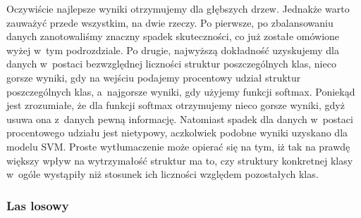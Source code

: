 Oczywiście najlepsze wyniki otrzymujemy dla głębszych drzew. Jednakże warto zauważyć przede wszystkim, na dwie rzeczy. Po pierwsze, po zbalansowaniu danych zanotowaliśmy znaczny spadek skuteczności, co już zostałe omówione wyżej w~tym podrozdziale. Po drugie, najwyższą dokładność uzyskujemy dla danych w~postaci bezwzględnej liczności struktur poszczególnych klas, nieco gorsze wyniki, gdy na wejściu podajemy procentowy udział struktur poszczególnych klas, a~najgorsze wyniki, gdy użyjemy funkcji softmax. Poniekąd jest zrozumiałe, że dla funkcji softmax otrzymujemy nieco gorsze wyniki, gdyż usuwa ona z~danych pewną informację. Natomiast spadek dla danych w~postaci procentowego udziału jest nietypowy, aczkolwiek podobne wyniki uzyskano dla modelu SVM. Proste wytłumaczenie może opierać się na tym, iż tak na prawdę większy wpływ na wytrzymałość struktur ma to, czy struktury konkretnej klasy w~ogóle wystąpiły niż stosunek ich liczności względem pozostałych klas.

\subsubsection{Las losowy}
\label{structures.with.rfc}

